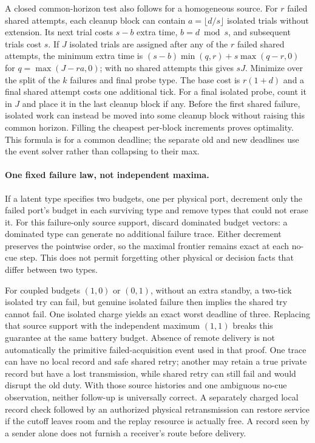 \documentclass[11pt]{article}
\begin{document}
A closed common-horizon test also follows for a homogeneous source.
For $r$ failed shared attempts, each cleanup block can contain
$a=\lfloor d/s\rfloor$ isolated trials without extension.
Its next trial costs $s-b$ extra time, $b=d\bmod s$, and subsequent
trials cost $s$. If $J$ isolated trials are assigned after any of
the $r$ failed shared attempts, the minimum extra time is
$(s-b)\min(q,r)+s\max(q-r,0)$ for $q=\max(J-ra,0)$; with no shared
attempts this gives $sJ$. Minimize over the split of the $k$ failures
and final probe type. The base cost is $r(1+d)$ and a final shared
attempt costs one additional tick. For a final isolated probe,
count it in $J$ and place it in the last cleanup block if any.
Before the first shared failure, isolated work can instead be
moved into some cleanup block without raising this common horizon.
Filling the cheapest per-block increments proves optimality.
This formula is for a common deadline; the separate old and new
deadlines use the event solver rather than collapsing to their max.

\paragraph{One fixed failure law, not independent maxima.}
If a latent type specifies two budgets, one per physical port,
decrement only the failed port's budget in each surviving type and
remove types that could not erase it. For this failure-only source
support, discard dominated budget vectors: a dominated type can
generate no additional failure trace. Either decrement preserves
the pointwise order, so the maximal frontier remains exact at
each no-cue step. This does not permit forgetting other physical
or decision facts that differ between two types.

For coupled budgets $(1,0)$ or $(0,1)$, without an extra standby,
a two-tick isolated try can fail, but genuine isolated failure then
implies the shared try cannot fail. One isolated charge yields an
exact worst deadline of three. Replacing that source support with
the independent maximum $(1,1)$ breaks this guarantee at the same
battery budget. Absence of remote delivery is not automatically the
primitive failed-acquisition event used in that proof. One trace
can have no local record and safe shared retry; another may retain
a true private record but have a lost transmission, while shared
retry can still fail and would disrupt the old duty. With those
source histories and one ambiguous no-cue observation, neither
follow-up is universally correct. A separately charged local record
check followed by an authorized physical retransmission can restore
service if the cutoff leaves room and the replay resource is actually
free. A record seen by a sender alone does not furnish a receiver's
route before delivery.
\end{document}
